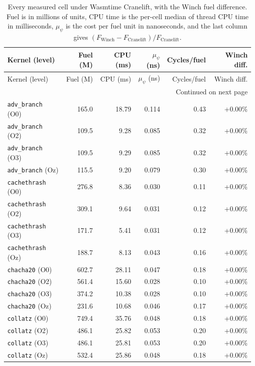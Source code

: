 {\scriptsize\setlength{\tabcolsep}{2pt}%
\begin{longtable}{lrrrrr}
\caption{Every measured cell under Wasmtime Cranelift, with the Winch fuel difference. Fuel is in millions of units, CPU time is the per-cell median of thread CPU time in milliseconds, $\mu_\psi$ is the cost per fuel unit in nanoseconds, and the last column gives $(F_{\mathrm{Winch}}-F_{\mathrm{Cranelift}})/F_{\mathrm{Cranelift}}$.}\label{tab:all_cells}\\
\toprule
Kernel (level) & Fuel (M) & CPU (ms) & $\mu_\psi$ (ns) & Cycles/fuel & Winch diff.\\
\midrule
\endfirsthead
\toprule
Kernel (level) & Fuel (M) & CPU (ms) & $\mu_\psi$ (ns) & Cycles/fuel & Winch diff.\\
\midrule
\endhead
\midrule
\multicolumn{6}{r}{Continued on next page}\\
\endfoot
\bottomrule
\endlastfoot
\texttt{adv\_branch} (O0) & 165.0 & 18.79 & 0.114 & 0.43 & +0.00\% \\
\texttt{adv\_branch} (O2) & 109.5 & 9.28 & 0.085 & 0.32 & +0.00\% \\
\texttt{adv\_branch} (O3) & 109.5 & 9.29 & 0.085 & 0.32 & +0.00\% \\
\texttt{adv\_branch} (Oz) & 115.5 & 9.20 & 0.079 & 0.30 & +0.00\% \\
\texttt{cachethrash} (O0) & 276.8 & 8.36 & 0.030 & 0.11 & +0.00\% \\
\texttt{cachethrash} (O2) & 309.1 & 9.64 & 0.031 & 0.12 & +0.00\% \\
\texttt{cachethrash} (O3) & 171.7 & 5.41 & 0.031 & 0.12 & +0.00\% \\
\texttt{cachethrash} (Oz) & 188.7 & 8.13 & 0.043 & 0.16 & +0.00\% \\
\texttt{chacha20} (O0) & 602.7 & 28.11 & 0.047 & 0.18 & +0.00\% \\
\texttt{chacha20} (O2) & 561.4 & 15.60 & 0.028 & 0.10 & +0.00\% \\
\texttt{chacha20} (O3) & 374.2 & 10.38 & 0.028 & 0.10 & +0.00\% \\
\texttt{chacha20} (Oz) & 231.6 & 10.68 & 0.046 & 0.17 & +0.00\% \\
\texttt{collatz} (O0) & 749.4 & 35.76 & 0.048 & 0.18 & +0.00\% \\
\texttt{collatz} (O2) & 486.1 & 25.82 & 0.053 & 0.20 & +0.00\% \\
\texttt{collatz} (O3) & 486.1 & 25.81 & 0.053 & 0.20 & +0.00\% \\
\texttt{collatz} (Oz) & 532.4 & 25.86 & 0.048 & 0.18 & +0.00\% \\

\end{longtable}}
